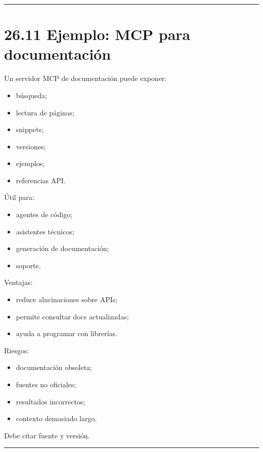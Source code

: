 \begin{center}\rule{0.5\linewidth}{0.5pt}\end{center}

\section{26.11 Ejemplo: MCP para
documentación}\label{ejemplo-mcp-para-documentaciuxf3n}

Un servidor MCP de documentación puede exponer:

\begin{itemize}
\tightlist
\item
  búsqueda;
\item
  lectura de páginas;
\item
  snippets;
\item
  versiones;
\item
  ejemplos;
\item
  referencias API.
\end{itemize}

Útil para:

\begin{itemize}
\tightlist
\item
  agentes de código;
\item
  asistentes técnicos;
\item
  generación de documentación;
\item
  soporte.
\end{itemize}

Ventajas:

\begin{itemize}
\tightlist
\item
  reduce alucinaciones sobre APIs;
\item
  permite consultar docs actualizadas;
\item
  ayuda a programar con librerías.
\end{itemize}

Riesgos:

\begin{itemize}
\tightlist
\item
  documentación obsoleta;
\item
  fuentes no oficiales;
\item
  resultados incorrectos;
\item
  contexto demasiado largo.
\end{itemize}

Debe citar fuente y versión.

\begin{center}\rule{0.5\linewidth}{0.5pt}\end{center}

